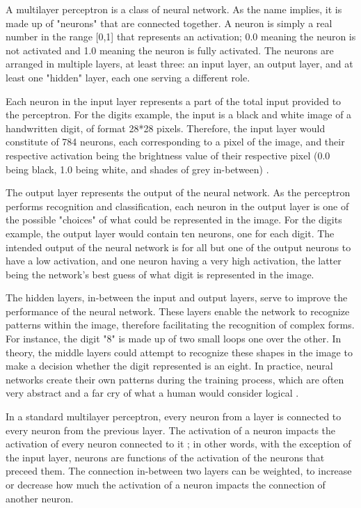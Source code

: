 \documentclass[12pt,a4paper,notitlepage]{article}
\begin{document}
A multilayer perceptron is a class of neural network. As the name implies, it is made up of "neurons" that are connected together. A neuron is simply a real number in the range [0,1] that represents an activation; 0.0 meaning the neuron is not activated and 1.0 meaning the neuron is fully activated. The neurons are arranged in multiple layers, at least three: an input layer, an output layer, and at least one "hidden" layer, each one serving a different role.

Each neuron in the input layer represents a part of the total input provided to the perceptron. For the digits example, the input is a black and white image of a handwritten digit, of format 28*28 pixels. Therefore, the input layer would constitute of 784 neurons, each corresponding to a pixel of the image, and their respective activation being the brightness value of their respective pixel (0.0 being black, 1.0 being white, and shades of grey in-between) \cite{sanderson_but_2017}.

The output layer represents the output of the neural network. As the perceptron performs recognition and classification, each neuron in the output layer is one of the possible "choices" of what could be represented in the image. For the digits example, the output layer would contain ten neurons, one for each digit. The intended output of the neural network is for all but one of the output neurons to have a low activation, and one neuron having a very high activation, the latter being the network's best guess of what digit is represented in the image.

The hidden layers, in-between the input and output layers, serve to improve the performance of the neural network. These layers enable the network to recognize patterns within the image, therefore facilitating the recognition of complex forms. For instance, the digit "8" is made up of two small loops one over the other. In theory, the middle layers could attempt to recognize these shapes in the image to make a decision whether the digit represented is an eight. In practice, neural networks create their own patterns during the training process, which are often very abstract and a far cry of what a human would consider logical \cite{sanderson_gradient_2017}.

In a standard multilayer perceptron, every neuron from a layer is connected to every neuron from the previous layer. The activation of a neuron impacts the activation of every neuron connected to it ; in other words, with the exception of the input layer, neurons are functions of the activation of the neurons that preceed them. The connection in-between two layers can be weighted, to increase or decrease how much the activation of a neuron impacts the connection of another neuron.
\end{document}

